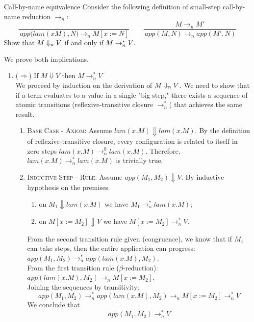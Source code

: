 
\begin{exercise}{Call-by-name equivalence}
Consider the following definition of small-step call-by-name reduction $\to_n$:
\[
\frac{}{\,app{(lam({x}{M})},{N}) \to_n M[x := N]}
\qquad
\frac{M \to_n M'}{\,app({M},{N}) \to_n app({M'},{N})}
\]
Show that $M \Downarrow_n V$ if and only if $M \to_n^* V$.
\end{exercise}

\begin{solution}
We prove both implications.

\begin{enumerate}
    \item {($\Rightarrow$)} If $M \Downarrow V$ then $M \to_n^* V$
\\
We proceed by induction on the derivation of $M \Downarrow_n V$. We need to show that if a term evaluates to a value in a single "big step," there exists a sequence of atomic transitions (reflexive-transitive closure $\to_n^*$) that achieves the same result.
\begin{enumerate}
    \item \textsc{Base Case - Axiom}: 
    Assume $lam(x.M)\Downarrow lam(x.M)$. 
    By the definition of reflexive-transitive closure, every configuration is related to itself in zero steps $lam(x.M)\to_n^0 lam(x.M)$. Therefore, $lam(x.M)\to_n^* lam(x.M)$ is trivially true.
    \item \textsc{Inductive Step - Rule}: Assume $app(M_1, M_2)\Downarrow V$. By inductive hypothesis on the premises.
    \begin{enumerate}
        \item on $M_1\Downarrow lam(x.M)$ we have $M_1\to^*_n lam(x.M)$;
        \item on $M[x:=M_2]\Downarrow V$ we have $M[x:=M_2]\to^*_n V$.
    \end{enumerate}
    From the second transition rule given (congruence), we know that if $M_1$ can take steps, then the entire application can progress: $app(M_1, M_2) \to_n^* app(lam(x.M), M_2)$. 
    \\From the first transition rule ($\beta$-reduction): $app(lam(x.M), M_2) \to_n M[x:=M_2]$.
    \\ Joining the sequences by transitivity: 
 \[app(M_1, M_2) \to_n^* app(lam(x.M), M_2)\to_n M[x:=M_2]\to_n^* V\]
 We conclude that  \[app(M_1, M_2) \to_n^*  V\]

\end{enumerate}


\end{enumerate}
\end{solution}

